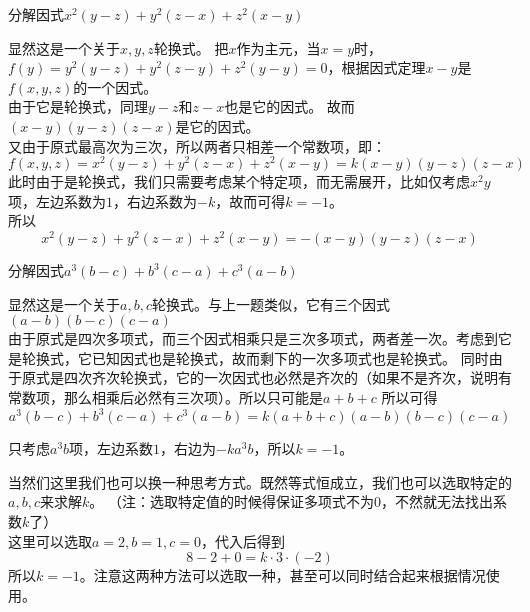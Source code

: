 \documentclass[windows,csize4,answers]{BHCexam}
\begin{document}
\begin{groups}
\begin{questions}[]
        \question[5] 分解因式$x^2(y-z)+y^2(z-x)+z^2(x-y)$
        \begin{solution}{0.5cm}
            \methodonly 显然这是一个关于$x,y,z$轮换式。
            把$x$作为主元，当$x=y$时，$f(y)=y^2(y-z)+y^2(z-y)+z^2(y-y)=0$，根据因式定理$x-y$是$f(x,y,z)$的一个因式。 \\
            由于它是轮换式，同理$y-z$和$z-x$也是它的因式。 故而$(x-y)(y-z)(z-x)$是它的因式。\\
            又由于原式最高次为三次，所以两者只相差一个常数项，即： \\
            \[
                f(x,y,z)= x^2(y-z)+y^2(z-x)+z^2(x-y) = k(x-y)(y-z)(z-x)
            \]
            此时由于是轮换式，我们只需要考虑某个特定项，而无需展开，比如仅考虑$x^2y$项，左边系数为$1$，右边系数为$-k$，故而可得$k=-1$。 \\
            所以
            \[
                x^2(y-z)+y^2(z-x)+z^2(x-y) = -(x-y)(y-z)(z-x)
            \]

        \end{solution}
        \vspace{3.5cm}

        \question[5] 分解因式$a^3(b-c)+b^3(c-a)+c^3(a-b)$
        \begin{solution}{0.5cm}
            \methodonly 显然这是一个关于$a,b,c$轮换式。与上一题类似，它有三个因式$(a-b)(b-c)(c-a)$ \\
            由于原式是四次多项式，而三个因式相乘只是三次多项式，两者差一次。考虑到它是轮换式，它已知因式也是轮换式，故而剩下的一次多项式也是轮换式。
            同时由于原式是四次齐次轮换式，它的一次因式也必然是齐次的（如果不是齐次，说明有常数项，那么相乘后必然有三次项）。所以只可能是$a+b+c$
            所以可得
            \[
                a^3(b-c)+b^3(c-a)+c^3(a-b)= k(a+b+c)(a-b)(b-c)(c-a)
            \]

            只考虑$a^3b$项，左边系数$1$，右边为$-ka^3b$，所以$k=-1$。

            当然们这里我们也可以换一种思考方式。既然等式恒成立，我们也可以选取特定的$a,b,c$来求解$k$。
            （注：选取特定值的时候得保证多项式不为0，不然就无法找出系数$k$了） \\
            这里可以选取$a=2,b=1,c=0$，代入后得到
            \[
                8-2+0=k\cdot 3  \cdot (-2)
            \]
            所以$k=-1$。注意这两种方法可以选取一种，甚至可以同时结合起来根据情况使用。
        \end{solution}
        \vspace{3.5cm}


\end{questions}
\end{groups}
\end{document}
